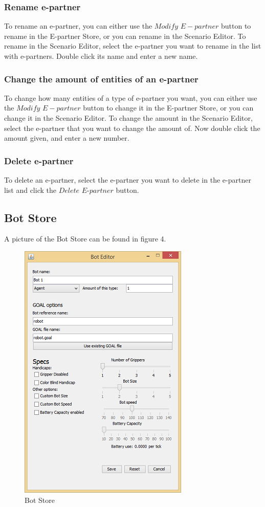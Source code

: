 \subsubsection{Rename e-partner}
To rename an e-partner, you can either use the $Modify$ $E-partner$ button to rename in the E-partner Store, or you can rename in the Scenario Editor. To rename in the Scenario Editor, select the e-partner you want to rename in the list with e-partners. Double click its name and enter a new name.

\subsubsection{Change the amount of entities of an e-partner}
To change how many entities of a type of e-partner you want, you can either use the $Modify$ $E-partner$ button to change it in the E-partner Store, or you can change it in the Scenario Editor. To change the amount in the Scenario Editor, select the e-partner that you want to change the amount of. Now double click the amount given, and enter a new number.

\subsubsection{Delete e-partner}
To delete an e-partner, select the e-partner you want to delete in the e-partner list and click the $Delete$ $E$-$partner$ button.

\subsection{Bot Store}
A picture of the Bot Store can be found in figure 4.
\begin{figure}[h]
\begin{center}
\includegraphics{ScenarioEditor/bs.png}
\end{center}
\caption{Bot Store}
\end{figure}
